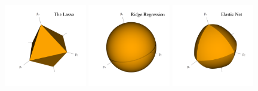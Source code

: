 \documentclass[10pt]{article}
\begin{document}
\begin{figure}
    \centering
    \includegraphics[width = 0.32\textwidth]{3D_lasso_contour.png}
    \includegraphics[width = 0.32\textwidth]{3D_ridge_contour.png}
    \includegraphics[width = 0.32\textwidth]{3D_enet_contour.png}
    

\end{figure}
\end{document}
